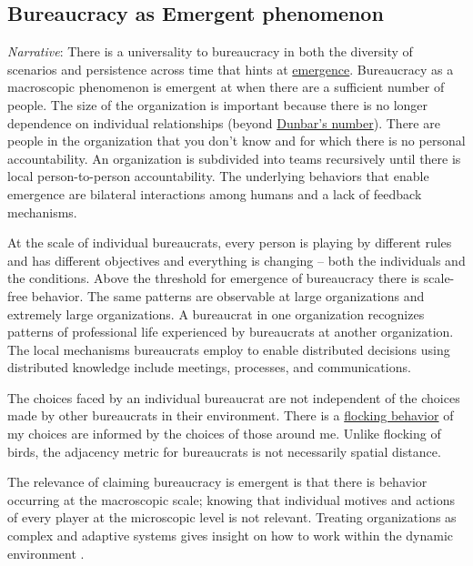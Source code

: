 

\subsection*{Bureaucracy as Emergent phenomenon}

\textit{Narrative}: There is a universality to bureaucracy in both the diversity of scenarios and persistence across time that hints at \href{https://en.wikipedia.org/wiki/Emergence}{emergence}. Bureaucracy as a macroscopic phenomenon is emergent at when there are a sufficient number of people. The size of the organization is important because there is no longer dependence on individual relationships (beyond \href{https://en.wikipedia.org/wiki/Dunbar\%27s_number}{Dunbar's number}). There are people in the organization that you don't know and for which there is no personal accountability. An organization is subdivided into teams recursively until there is local person-to-person accountability.  The underlying behaviors that enable emergence are bilateral interactions among humans and a lack of feedback mechanisms. 

At the scale of individual bureaucrats, every person is playing by different rules and has different objectives and everything is changing -- both the individuals and the conditions. 
Above the threshold for emergence of bureaucracy there is scale-free behavior. The same patterns are observable at large organizations and extremely large organizations. A bureaucrat in one organization recognizes patterns of professional life experienced by bureaucrats at another organization. The local mechanisms bureaucrats employ to enable distributed decisions using distributed knowledge include meetings, processes, and communications. 

The choices faced by an individual bureaucrat are not independent of the choices made by other bureaucrats in their environment. There is a \href{https://en.wikipedia.org/wiki/Flocking_(behavior)}{flocking behavior} of my choices are informed by the choices of those around me. Unlike flocking of birds, the adjacency metric for bureaucrats is not necessarily spatial distance.


The relevance of claiming bureaucracy is emergent is that there is behavior occurring at the macroscopic scale; knowing that individual motives and actions of every player at the microscopic level is not relevant. Treating organizations as complex and adaptive systems gives insight on how to work within the dynamic environment \cite{2011_Eisenhardt}.


